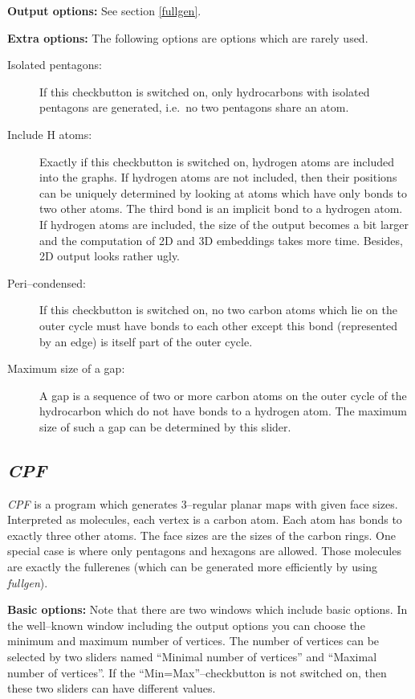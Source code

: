 \documentclass[a4paper]{article}
\begin{document}
\noindent\textbf{Output options:} See section \ref{fullgen}. 

\noindent\textbf{Extra options:} 
The following options are options which are rarely used.
\begin{description}
\item[Isolated pentagons:] If this checkbutton is switched on, only 
hydrocarbons with isolated pentagons are generated, i.e.~no two pentagons share
an atom.
\item[Include H atoms:] Exactly if this checkbutton is switched on, hydrogen
atoms are included into the graphs. If hydrogen atoms are not included, then
their positions can be uniquely determined by looking at atoms which have only
bonds to two other atoms. The third bond is an implicit bond to a hydrogen
atom. If hydrogen atoms are included, the size of the output becomes a bit 
larger and the computation of 2D and 3D embeddings takes more time. Besides,
2D output looks rather ugly.
\item[Peri--condensed:] If this checkbutton is switched on, no two carbon atoms
which lie on the outer cycle must have bonds to each other except this bond 
(represented by an edge) is itself part of the outer cycle.
\item[Maximum size of a gap:] A gap is a sequence of two or more carbon atoms
on the outer cycle of the hydrocarbon which do not have bonds to a hydrogen
atom. The maximum size of such a gap can be determined by this slider.
\end{description}

\subsection{\textit{CPF}}
\textit{CPF} is a program which generates 3--regular planar maps with given
face sizes. Interpreted as molecules, each vertex is a carbon atom. Each 
atom has bonds to exactly three other atoms. The face sizes are the sizes of
the carbon rings. One special case is where only pentagons and hexagons are
allowed. Those molecules are exactly the fullerenes (which can be generated
more efficiently by using \textit{fullgen}). 

\noindent
\textbf{Basic options:} Note that there are two windows which include basic 
options. In the well--known window including the output options you can
choose the minimum and maximum number of vertices.
The number of vertices can be selected by two sliders named ``Minimal number
of vertices'' and ``Maximal number of vertices''. If the 
``Min=Max''--checkbutton is not switched on, then these two sliders can have
different values.
\end{document}
